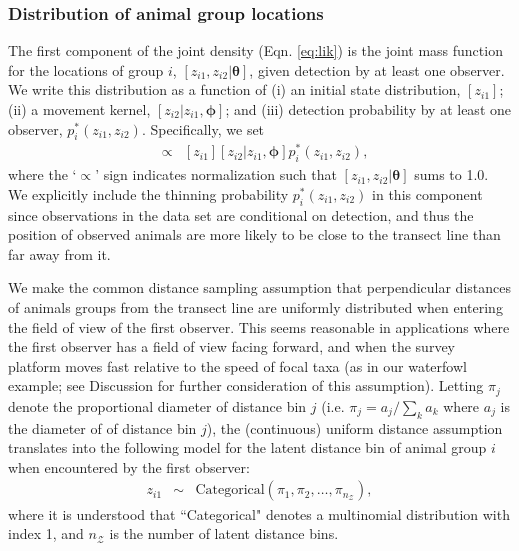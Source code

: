 \documentclass[aoas,preprint]{imsart}
\numberwithin{equation}{section}
\theoremstyle{plain}
\begin{document}
\subsubsection{Distribution of animal group locations}

The first component of the joint density (Eqn. \ref{eq:lik}) is the joint mass function for the locations of group $i$, $[z_{i1},z_{i2}|\boldsymbol{\theta}]$, given detection by at least one observer.  We write this distribution as a function of (i) an initial state distribution, $[z_{i1}]$; (ii) a movement kernel, $[z_{i2}|z_{i1},\boldsymbol{\phi}]$; and (iii) detection probability by at least one observer, $p_i^*(z_{i1},z_{i2})$.  Specifically, we set
\begin{eqnarray}
[z_{i 1},z_{i 2} |\boldsymbol{\theta}] & \propto & [z_{i1}][z_{i2}|z_{i1},\boldsymbol{\phi}]p_i^*(z_{i1},z_{i2}),
\label{eq:z}
\end{eqnarray}
where the `$\propto$' sign indicates normalization such that $[z_{i 1},z_{i 2} |\boldsymbol{\theta}]$ sums to 1.0.
We explicitly include the thinning probability $p_i^*(z_{i1},z_{i2})$ in this component since observations in the data set are conditional on detection, and thus the position of observed animals are more likely to be close to the transect line than far away from it.

We make the common distance sampling assumption \citep[cf.][]{BucklandEtAl2001} that perpendicular distances of animals groups from the transect line are uniformly distributed when entering the field of view of the first observer.  This seems reasonable in applications where the first observer has a field of view facing forward, and when the survey platform moves fast relative to the speed of focal taxa (as in our waterfowl example; see Discussion for further consideration of this assumption). Letting $\pi_j$ denote the proportional diameter of distance bin $j$ (i.e. $\pi_j = a_j / \sum_k a_k$ where $a_j$ is the diameter of of distance bin $j$), the (continuous) uniform distance assumption translates into the following model for the latent distance bin of animal group $i$ when encountered by the first observer:
\begin{eqnarray*}
  z_{i1} & \sim & \text{Categorical}(\pi_1,\pi_2,\hdots,\pi_{n_{\mathcal{Z}}}),
\end{eqnarray*}
where it is understood that ``Categorical" denotes a multinomial distribution with index 1, and $n_{\mathcal{Z}}$ is the number of latent distance bins.
\end{document}
